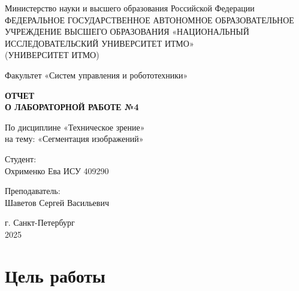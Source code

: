 \documentclass[a4paper,12pt]{article}
\begin{document}
	\begin{titlepage}
		\centering
		\vspace*{1cm}
		
		{\large Министерство науки и высшего образования Российской Федерации}\\
		{\large ФЕДЕРАЛЬНОЕ ГОСУДАРСТВЕННОЕ АВТОНОМНОЕ ОБРАЗОВАТЕЛЬНОЕ УЧРЕЖДЕНИЕ ВЫСШЕГО ОБРАЗОВАНИЯ «НАЦИОНАЛЬНЫЙ ИССЛЕДОВАТЕЛЬСКИЙ УНИВЕРСИТЕТ ИТМО»}\\
		{\large (УНИВЕРСИТЕТ ИТМО)}\\
		
		\vspace{2cm}
		
		{\large Факультет «Систем управления и робототехники»}\\
		
		\vspace{3cm}
		
		\textbf{{\Huge ОТЧЕТ}\\
			{\Huge О ЛАБОРАТОРНОЙ РАБОТЕ №4}}\\
		
		\vspace{1cm}
		
		{\LARGE По дисциплине «Техническое зрение»}\\
		{\LARGE на тему: «Сегментация изображений»}\\
		
		\vspace{2cm}
		
		{\Large Студент:}\\
		Охрименко Ева ИСУ 409290\\
		
		\vspace{2cm}
		
		{\Large Преподаватель:}\\
		Шаветов Сергей Васильевич\\
		
		\vspace{5cm}
		
		{\large г. Санкт-Петербург}\\
		{\large 2025}
		
	\end{titlepage}
	
	\tableofcontents  %
	\newpage
	
	\section*{Цель работы}
	
\end{document}
